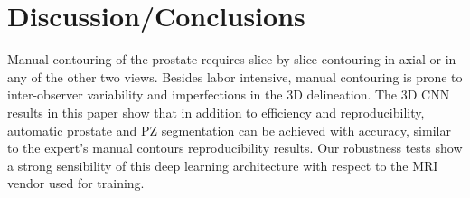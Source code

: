 \section{Discussion/Conclusions}
\label{sec:disc}
Manual contouring of the prostate requires slice-by-slice contouring 
in axial or in any of the other two views. Besides labor intensive, manual 
contouring is prone to inter-observer variability and imperfections 
in the 3D delineation. The 3D CNN results in this paper show 
that in addition to efficiency and reproducibility, automatic prostate and PZ 
segmentation can be achieved with accuracy, similar to the expert's manual 
contours reproducibility results. Our robustness tests show a strong 
sensibility of this deep learning architecture with respect to the MRI vendor
used for training. 


